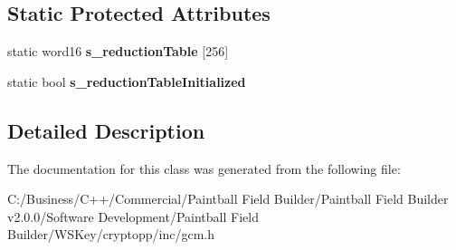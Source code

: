\subsection*{Static Protected Attributes}
\begin{DoxyCompactItemize}
\item 
\hypertarget{class_g_c_m___base_a81d3a23f651486b5d0d3ff8eb36c30ed}{
static word16 {\bfseries s\_\-reductionTable} \mbox{[}256\mbox{]}}
\label{class_g_c_m___base_a81d3a23f651486b5d0d3ff8eb36c30ed}

\item 
\hypertarget{class_g_c_m___base_ab7d77c3ea888fd9de365581c6bb97d20}{
static bool {\bfseries s\_\-reductionTableInitialized}}
\label{class_g_c_m___base_ab7d77c3ea888fd9de365581c6bb97d20}

\end{DoxyCompactItemize}


\subsection{Detailed Description}


The documentation for this class was generated from the following file:\begin{DoxyCompactItemize}
\item 
C:/Business/C++/Commercial/Paintball Field Builder/Paintball Field Builder v2.0.0/Software Development/Paintball Field Builder/WSKey/cryptopp/inc/gcm.h\end{DoxyCompactItemize}
